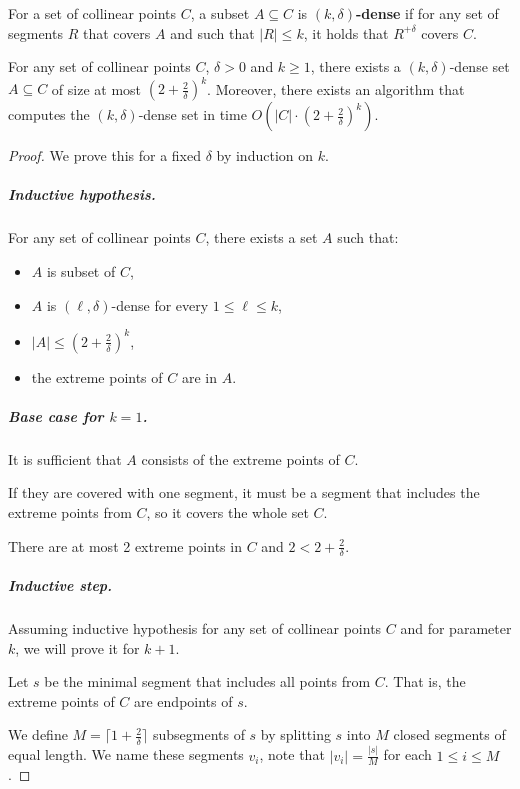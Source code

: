 \begin{defi}
	For a set of collinear points $C$,
	a subset $A \subseteq C$ is \textbf{$(k,\delta)$-dense} 
	if for any set of segments $R$ that covers $A$ and
	such that $|R| \le k$, it holds that $R^{+\delta}$ covers $C$.
\end{defi}

\begin{lemma}
	\label{dense_set_exists}
	For any set of collinear points $C$, $\delta > 0$ and $k \ge 1$,
	there exists a $(k,\delta)$-dense set $A \subseteq C$ of size
	at most $(2+\frac{2}{\delta})^k$.
	Moreover, there exists an algorithm that computes the $(k,\delta)$-dense set
	in time $O(|C| \cdot (2+\frac{2}{\delta})^k)$.
\end{lemma}

\begin{proof}
We prove this for a fixed $\delta$ by induction on $k$.

\subparagraph{Inductive hypothesis.}
For any set of collinear points $C$, there exists a set $A$ such that:
\begin{itemize}
\item $A$ is subset of $C$,
\item $A$ is $(\ell, \delta)$-dense for every $1 \le \ell \le k$,
\item $|A| \le (2+\frac{2}{\delta})^k$,
\item the extreme points of $C$ are in $A$.
\end{itemize}

\subparagraph{Base case for $k = 1$.}
It is sufficient that $A$ consists of the extreme points of $C$.

If they are covered with one segment, it must be a segment 
that includes the extreme points from $C$, so it covers the whole set $C$.

There are at most 2 extreme points in $C$ and $2 < 2+\frac{2}{\delta}$.

\subparagraph{Inductive step.}
Assuming inductive hypothesis for any set of collinear points $C$
and for parameter $k$, we will prove it for $k+1$.

Let $s$ be the minimal segment that includes all points from $C$.
That is, the extreme points of $C$ are endpoints of $s$.

We define $M = \lceil1+\frac{2}{\delta}\rceil$ subsegments of $s$
by splitting $s$ into $M$ closed segments of equal length.
We name these segments $v_i$, note that
$|v_i| = \frac{|s|}{M}$ for each $1 \le i \le M$.


\end{proof}
